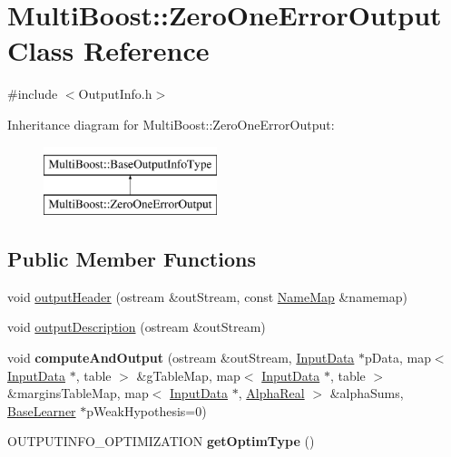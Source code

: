 \hypertarget{classMultiBoost_1_1ZeroOneErrorOutput}{\section{Multi\-Boost\-:\-:Zero\-One\-Error\-Output Class Reference}
\label{classMultiBoost_1_1ZeroOneErrorOutput}
}


{\ttfamily \#include $<$Output\-Info.\-h$>$}

Inheritance diagram for Multi\-Boost\-:\-:Zero\-One\-Error\-Output\-:\begin{figure}[H]
\begin{center}
\leavevmode
\includegraphics[height=2.000000cm]{classMultiBoost_1_1ZeroOneErrorOutput}
\end{center}
\end{figure}
\subsection*{Public Member Functions}
\begin{DoxyCompactItemize}
\item 
void \hyperlink{classMultiBoost_1_1ZeroOneErrorOutput_aec8b0221c76cccdd34e2b5905a8bf549}{output\-Header} (ostream \&out\-Stream, const \hyperlink{classMultiBoost_1_1NameMap}{Name\-Map} \&namemap)
\item 
void \hyperlink{classMultiBoost_1_1ZeroOneErrorOutput_ae18378766ab4ca425c79bb58f1688cf2}{output\-Description} (ostream \&out\-Stream)
\item 
\hypertarget{classMultiBoost_1_1ZeroOneErrorOutput_a339e28c1823df2d81db32c2167e8270e}{void {\bfseries compute\-And\-Output} (ostream \&out\-Stream, \hyperlink{classMultiBoost_1_1InputData}{Input\-Data} $\ast$p\-Data, map$<$ \hyperlink{classMultiBoost_1_1InputData}{Input\-Data} $\ast$, table $>$ \&g\-Table\-Map, map$<$ \hyperlink{classMultiBoost_1_1InputData}{Input\-Data} $\ast$, table $>$ \&margins\-Table\-Map, map$<$ \hyperlink{classMultiBoost_1_1InputData}{Input\-Data} $\ast$, \hyperlink{Defaults_8h_a80184c4fd10ab70a1a17c5f97dcd1563}{Alpha\-Real} $>$ \&alpha\-Sums, \hyperlink{classMultiBoost_1_1BaseLearner}{Base\-Learner} $\ast$p\-Weak\-Hypothesis=0)}\label{classMultiBoost_1_1ZeroOneErrorOutput_a339e28c1823df2d81db32c2167e8270e}

\item 
\hypertarget{classMultiBoost_1_1ZeroOneErrorOutput_a0ad050443404478bc04379e0561006f3}{O\-U\-T\-P\-U\-T\-I\-N\-F\-O\-\_\-\-O\-P\-T\-I\-M\-I\-Z\-A\-T\-I\-O\-N {\bfseries get\-Optim\-Type} ()}\label{classMultiBoost_1_1ZeroOneErrorOutput_a0ad050443404478bc04379e0561006f3}

\end{DoxyCompactItemize}
